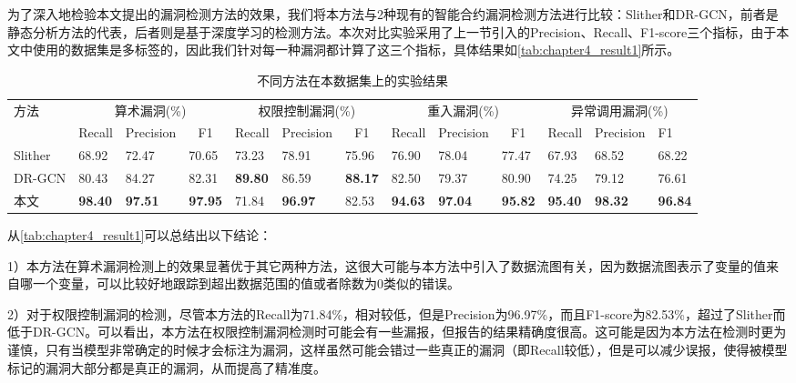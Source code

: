 为了深入地检验本文提出的漏洞检测方法的效果，我们将本方法与2种现有的智能合约漏洞检测方法进行比较：Slither\cite{slither}和DR-GCN\cite{liu2021smart}，前者是静态分析方法的代表，后者则是基于深度学习的检测方法。本次对比实验采用了上一节引入的Precision、Recall、F1-score三个指标，由于本文中使用的数据集是多标签的，因此我们针对每一种漏洞都计算了这三个指标，具体结果如\autoref{tab:chapter4_result1}所示。
\begin{table}[htbp]
    \caption{\label{tab:chapter4_result1}不同方法在本数据集上的实验结果}
    \fontsize{8pt}{10pt}\selectfont
    \renewcommand{\arraystretch}{1.5}
    \begin{tabularx}{\linewidth}{p{1.3cm}|X<{\centering}X<{\centering}X<{\centering}|X<{\centering}X<{\centering}X<{\centering}|X<{\centering}X<{\centering}X<{\centering}|X<{\centering}X<{\centering}X<{\centering}}
        \hline
        \multirow{2}{*}{方法} & \multicolumn{3}{c|}{算术漏洞(\%)} & \multicolumn{3}{c|}{权限控制漏洞(\%)} & \multicolumn{3}{c|}{重入漏洞(\%)} & \multicolumn{3}{c}{异常调用漏洞(\%)} \\ \cline{2-13} 
                            & {Recall} & {Precision} & \multicolumn{1}{c|}{F1} & {Recall} & {Precision} & \multicolumn{1}{c|}{F1} & {Recall} & {Precision} & \multicolumn{1}{c|}{F1} & {Recall} & {Precision} & {F1} \\ \hline
        Slither & 68.92 & 72.47 & 70.65       & 73.23 & 78.91 & 75.96       & 76.90 & 78.04 & 77.47       & 67.93 & 68.52 & 68.22      \\
        DR-GCN & 80.43 & 84.27 & 82.31       & \textbf{89.80} & 86.59 & \textbf{88.17} & 82.50 & 79.37 & 80.90       & 74.25 & 79.12 & 76.61      \\
        本文      & \textbf{98.40} & \textbf{97.51}    & \textbf{97.95} & 71.84 & \textbf{96.97}    & 82.53       & \textbf{94.63} & \textbf{97.04}    & \textbf{95.82} & \textbf{95.40} & \textbf{98.32}    & \textbf{96.84}         \\ \hline
        \end{tabularx}
\end{table}

从\autoref{tab:chapter4_result1}可以总结出以下结论：

1）本方法在算术漏洞检测上的效果显著优于其它两种方法，这很大可能与本方法中引入了数据流图有关，因为数据流图表示了变量的值来自哪一个变量，可以比较好地跟踪到超出数据范围的值或者除数为0类似的错误。

2）对于权限控制漏洞的检测，尽管本方法的Recall为71.84\%，相对较低，但是Precision为96.97\%，而且F1-score为82.53\%，超过了Slither而低于DR-GCN。可以看出，本方法在权限控制漏洞检测时可能会有一些漏报，但报告的结果精确度很高。这可能是因为本方法在检测时更为谨慎，只有当模型非常确定的时候才会标注为漏洞，这样虽然可能会错过一些真正的漏洞（即Recall较低），但是可以减少误报，使得被模型标记的漏洞大部分都是真正的漏洞，从而提高了精准度。

